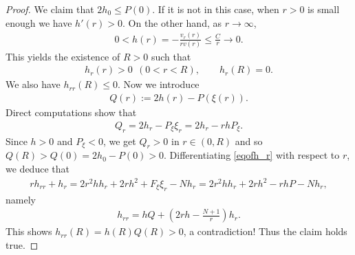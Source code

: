 \documentclass{article}
\theoremstyle{definition} \theoremstyle{remark}
\numberwithin{equation}{section}
\begin{document}
\begin{proof}
		We claim that $2h_0 \le P(0)$. If it is not in this case, when $r > 0$ is small enough we have $h'(r) > 0$. On the other hand, as $r \to \infty$,
		\begin{align*}
			0 < h(r) = -\frac{v_r(r)}{rv(r)} \le \frac{C}{r} \to 0.
		\end{align*}
		This yields the existence of $R > 0$ such that
		\begin{align*}
			h_r(r) > 0 ~~ (0 < r < R), \quad\quad h_r(R) = 0.
		\end{align*}
		We also have $h_{rr}(R) \le 0$. Now we introduce
		\begin{align*}
			Q(r) := 2h(r) - P(\xi(r)).
		\end{align*}
		Direct computations show that
		\begin{align*}
			Q_r = 2h_r - P_\xi \xi_r = 2h_r - rh P_\xi.
		\end{align*}
		Since $h > 0$ and $P_\xi < 0$, we get $Q_r > 0$ in $r \in (0,R)$ and so $Q(R) > Q(0) = 2h_0 - P(0) > 0$. Differentiating \eqref{eqofh_r} with respect to $r$, we deduce that
		\begin{align*}
			rh_{rr} + h_r = 2r^2hh_r + 2rh^2 + F_\xi \xi_r - Nh_r = 2r^2hh_r + 2rh^2 - rhP - Nh_r,
		\end{align*}
		namely
		\begin{align} \label{eqofhrr}
			h_{rr} = hQ + \left(2rh - \frac{N+1}{r}\right)h_r.
		\end{align}
		This shows $h_{rr}(R) = h(R)Q(R) > 0$, a contradiction! Thus the claim holds true.


\end{proof}
\end{document}

